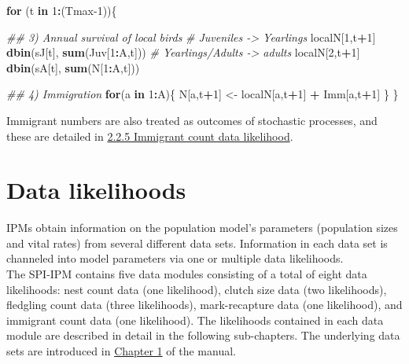 \documentclass[
]{book}
\newenvironment{Shaded}{\begin{snugshade}}{\end{snugshade}}
\newcommand{\CommentTok}[1]{\textcolor[rgb]{0.56,0.35,0.01}{\textit{#1}}}
\newcommand{\ControlFlowTok}[1]{\textcolor[rgb]{0.13,0.29,0.53}{\textbf{#1}}}
\newcommand{\DecValTok}[1]{\textcolor[rgb]{0.00,0.00,0.81}{#1}}
\newcommand{\KeywordTok}[1]{\textcolor[rgb]{0.13,0.29,0.53}{\textbf{#1}}}
\newcommand{\NormalTok}[1]{#1}
\newcommand{\OperatorTok}[1]{\textcolor[rgb]{0.81,0.36,0.00}{\textbf{#1}}}
\newcommand{\StringTok}[1]{\textcolor[rgb]{0.31,0.60,0.02}{#1}}
\begin{document}
\begin{Shaded}
\begin{Highlighting}[]
\ControlFlowTok{for}\NormalTok{ (t }\ControlFlowTok{in} \DecValTok{1}\OperatorTok{:}\NormalTok{(Tmax}\DecValTok{-1}\NormalTok{))\{}
  
  \CommentTok{## 3) Annual survival of local birds}
  \CommentTok{# Juveniles -> Yearlings}
\NormalTok{  localN[}\DecValTok{1}\NormalTok{,t}\OperatorTok{+}\DecValTok{1}\NormalTok{] }\OperatorTok{~}\StringTok{ }\KeywordTok{dbin}\NormalTok{(sJ[t], }\KeywordTok{sum}\NormalTok{(Juv[}\DecValTok{1}\OperatorTok{:}\NormalTok{A,t]))}
  \CommentTok{# Yearlings/Adults -> adults}
\NormalTok{  localN[}\DecValTok{2}\NormalTok{,t}\OperatorTok{+}\DecValTok{1}\NormalTok{] }\OperatorTok{~}\StringTok{ }\KeywordTok{dbin}\NormalTok{(sA[t], }\KeywordTok{sum}\NormalTok{(N[}\DecValTok{1}\OperatorTok{:}\NormalTok{A,t]))}
  
  \CommentTok{## 4) Immigration}
  \ControlFlowTok{for}\NormalTok{(a }\ControlFlowTok{in} \DecValTok{1}\OperatorTok{:}\NormalTok{A)\{}
\NormalTok{    N[a,t}\OperatorTok{+}\DecValTok{1}\NormalTok{] <-}\StringTok{ }\NormalTok{localN[a,t}\OperatorTok{+}\DecValTok{1}\NormalTok{] }\OperatorTok{+}\StringTok{ }\NormalTok{Imm[a,t}\OperatorTok{+}\DecValTok{1}\NormalTok{]}
\NormalTok{  \}}
\NormalTok{\}}
\end{Highlighting}
\end{Shaded}

Immigrant numbers are also treated as outcomes of stochastic processes, and
these are detailed in \protect\hyperlink{ux5cux23ux5cux23ux5cux2520Immigrantux5cux2520countux5cux2520dataux5cux2520likelihood}{2.2.5 Immigrant count data likelihood}.

\hypertarget{data-likelihoods}{%
\section{Data likelihoods}\label{data-likelihoods}}

IPMs obtain information on the population model's parameters (population sizes
and vital rates) from several different data sets. Information in each data set
is channeled into model parameters via one or multiple data likelihoods.\\
The SPI-IPM contains five data modules consisting of a total of eight data
likelihoods: nest count data (one likelihood), clutch size data (two likelihoods),
fledgling count data (three likelihoods), mark-recapture data (one likelihood),
and immigrant count data (one likelihood).
The likelihoods contained in each data module are described in detail in the
following sub-chapters. The underlying data sets are introduced in
\protect\hyperlink{DataPrep}{Chapter 1} of the manual.
\end{document}
